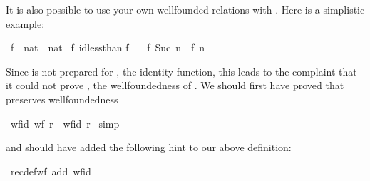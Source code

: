 \begin{isabellebody}
\begin{isamarkuptext}
It is also possible to use your own wellfounded relations with .
Here is a simplistic example:%
\end{isamarkuptext}%
\ f\ {\isacharcolon}{\isacharcolon}\ {\isachardoublequote}nat\ {\isasymRightarrow}\ nat{\isachardoublequote}\isanewline
{}\ f\ {\isachardoublequote}id{\isacharparenleft}less{\isacharunderscore}than{\isacharparenright}{\isachardoublequote}\isanewline
{\isachardoublequote}f\ {}\ {\isacharequal}\ {}{\isachardoublequote}\isanewline
{\isachardoublequote}f\ {\isacharparenleft}Suc\ n{\isacharparenright}\ {\isacharequal}\ f\ n{\isachardoublequote}%
\begin{isamarkuptext}%
Since  is not prepared for , the identity
function, this leads to the complaint that it could not prove
, the wellfoundedness of . We should first have proved that  preserves wellfoundedness%
\end{isamarkuptext}%
\ wf{\isacharunderscore}id{\isacharcolon}\ {\isachardoublequote}wf\ r\ {\isasymLongrightarrow}\ wf{\isacharparenleft}id\ r{\isacharparenright}{\isachardoublequote}\isanewline
{}\ simp%
\begin{isamarkuptext}%
\noindent
and should have added the following hint to our above definition:%
\end{isamarkuptext}%
{\isacharparenleft}\ recdef{\isacharunderscore}wf\ add{\isacharcolon}\ wf{\isacharunderscore}id{\isacharparenright}\end{isabellebody}%
